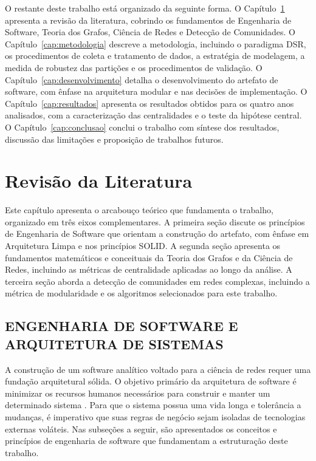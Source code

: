 \documentclass[
      12pt,
      a4paper,
      openright,
      oneside,
      chapter=TITLE,
      section=TITLE,
      english,
      french,
      spanish,
      brazilian
    ]{abntex2}
\begin{document}
    O restante deste trabalho está organizado da seguinte forma. O Capítulo~\ref{cap:revisao} apresenta a revisão da literatura, cobrindo os fundamentos de Engenharia de Software, Teoria dos Grafos, Ciência de Redes e Detecção de Comunidades. O Capítulo~\ref{cap:metodologia} descreve a metodologia, incluindo o paradigma DSR, os procedimentos de coleta e tratamento de dados, a estratégia de modelagem, a medida de robustez das partições e os procedimentos de validação. O Capítulo~\ref{cap:desenvolvimento} detalha o desenvolvimento do artefato de software, com ênfase na arquitetura modular e nas decisões de implementação. O Capítulo~\ref{cap:resultados} apresenta os resultados obtidos para os quatro anos analisados, com a caracterização das centralidades e o teste da hipótese central. O Capítulo~\ref{cap:conclusao} conclui o trabalho com síntese dos resultados, discussão das limitações e proposição de trabalhos futuros.
    
    \chapter{Revisão da Literatura}
\label{cap:revisao}
    
    Este capítulo apresenta o arcabouço teórico que fundamenta o trabalho, organizado em três eixos complementares. A primeira seção discute os princípios de Engenharia de Software que orientam a construção do artefato, com ênfase em Arquitetura Limpa e nos princípios SOLID. A segunda seção apresenta os fundamentos matemáticos e conceituais da Teoria dos Grafos e da Ciência de Redes, incluindo as métricas de centralidade aplicadas ao longo da análise. A terceira seção aborda a detecção de comunidades em redes complexas, incluindo a métrica de modularidade e os algoritmos selecionados para este trabalho.
    
    \section{ENGENHARIA DE SOFTWARE E ARQUITETURA DE SISTEMAS}
    
    A construção de um software analítico voltado para a ciência de redes requer uma fundação arquitetural sólida. O objetivo primário da arquitetura de software é minimizar os recursos humanos necessários para construir e manter um determinado sistema \cite{martin2017}. Para que o sistema possua uma vida longa e tolerância a mudanças, é imperativo que suas regras de negócio sejam isoladas de tecnologias externas voláteis. Nas subseções a seguir, são apresentados os conceitos e princípios de engenharia de software que fundamentam a estruturação deste trabalho.
    
\end{document}
